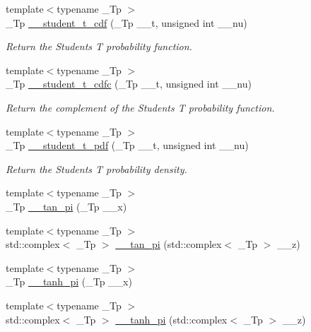 \begin{DoxyCompactItemize}
\item 
{\footnotesize template$<$typename \+\_\+\+Tp $>$ }\\\+\_\+\+Tp \hyperlink{namespacestd_1_1____detail_aadc19f2a38494343a752a8d4f924e3df}{\+\_\+\+\_\+student\+\_\+t\+\_\+cdf} (\+\_\+\+Tp \+\_\+\+\_\+t, unsigned int \+\_\+\+\_\+nu)
\begin{DoxyCompactList}\small\item\em Return the Students T probability function. \end{DoxyCompactList}\item 
{\footnotesize template$<$typename \+\_\+\+Tp $>$ }\\\+\_\+\+Tp \hyperlink{namespacestd_1_1____detail_a3009eaaa4b7d6d845878765ef0e3fa27}{\+\_\+\+\_\+student\+\_\+t\+\_\+cdfc} (\+\_\+\+Tp \+\_\+\+\_\+t, unsigned int \+\_\+\+\_\+nu)
\begin{DoxyCompactList}\small\item\em Return the complement of the Students T probability function. \end{DoxyCompactList}\item 
{\footnotesize template$<$typename \+\_\+\+Tp $>$ }\\\+\_\+\+Tp \hyperlink{namespacestd_1_1____detail_a866bf8f03fd2d5de5024837727beecd8}{\+\_\+\+\_\+student\+\_\+t\+\_\+pdf} (\+\_\+\+Tp \+\_\+\+\_\+t, unsigned int \+\_\+\+\_\+nu)
\begin{DoxyCompactList}\small\item\em Return the Students T probability density. \end{DoxyCompactList}\item 
{\footnotesize template$<$typename \+\_\+\+Tp $>$ }\\\+\_\+\+Tp \hyperlink{namespacestd_1_1____detail_a72fd3b7fcf9f49ade9411d782e8dbe4e}{\+\_\+\+\_\+tan\+\_\+pi} (\+\_\+\+Tp \+\_\+\+\_\+x)
\item 
{\footnotesize template$<$typename \+\_\+\+Tp $>$ }\\std\+::complex$<$ \+\_\+\+Tp $>$ \hyperlink{namespacestd_1_1____detail_ae19d579db4245c9c4e53a70a0513bb00}{\+\_\+\+\_\+tan\+\_\+pi} (std\+::complex$<$ \+\_\+\+Tp $>$ \+\_\+\+\_\+z)
\item 
{\footnotesize template$<$typename \+\_\+\+Tp $>$ }\\\+\_\+\+Tp \hyperlink{namespacestd_1_1____detail_ab0c02d3c15b8297df52b74807f22169b}{\+\_\+\+\_\+tanh\+\_\+pi} (\+\_\+\+Tp \+\_\+\+\_\+x)
\item 
{\footnotesize template$<$typename \+\_\+\+Tp $>$ }\\std\+::complex$<$ \+\_\+\+Tp $>$ \hyperlink{namespacestd_1_1____detail_a75775747d40813d5d54c0b7a7d0c39f0}{\+\_\+\+\_\+tanh\+\_\+pi} (std\+::complex$<$ \+\_\+\+Tp $>$ \+\_\+\+\_\+z)

\end{DoxyCompactItemize}
